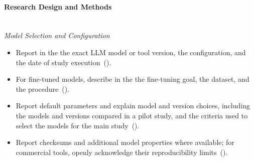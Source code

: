 \paragraph{\textbf{Research Design and Methods}}\mbox{}\\
\noindent\textit{Model Selection and Configuration}
\begin{itemize}[label={},leftmargin=*]
    \item \iconM Report in the \paper the exact LLM model or tool version, the configuration, and the date of study execution~().
    \item \iconM {} For fine-tuned models, describe in the \paper the fine-tuning goal, the dataset, and the procedure~().
    \item \iconS Report default parameters and explain model and version choices, including the models and versions compared in a pilot study, and the criteria used to select the models for the main study~().
    \item \iconS Report checksums and additional model properties where available; for commercial tools, openly acknowledge their reproducibility limits~().

\end{itemize}
